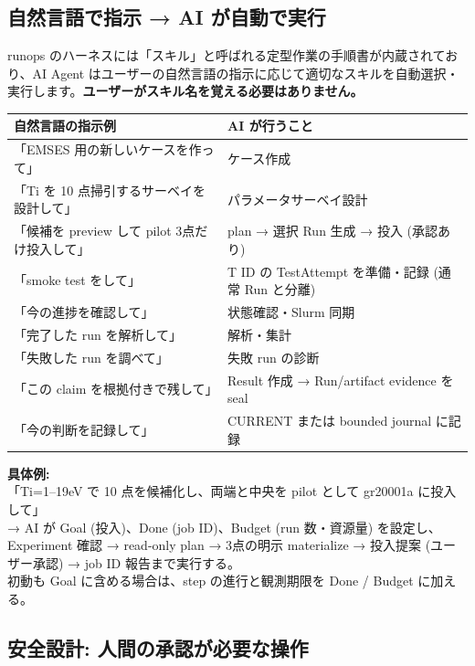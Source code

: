 \documentclass[a4paper,11pt]{article}
\newenvironment{infobox}{%
  \medskip\noindent
  \fboxrule=0.5pt\fboxsep=8pt
  \fcolorbox{infoframe}{infobg}\bgroup\minipage{\dimexpr\linewidth-2\fboxsep-2\fboxrule}
}{%
  \endminipage\egroup\medskip
}
\begin{document}
\subsection*{\color{accent} 自然言語で指示 → AI が自動で実行}

runops のハーネスには「スキル」と呼ばれる定型作業の手順書が内蔵されており、AI Agent はユーザーの自然言語の指示に応じて適切なスキルを自動選択・実行します。\textbf{ユーザーがスキル名を覚える必要はありません。}

\begin{center}
\begin{tabular}{ll}
\toprule
\textbf{自然言語の指示例} & \textbf{AI が行うこと} \\
\midrule
「EMSES 用の新しいケースを作って」 & ケース作成 \\
「Ti を 10 点掃引するサーベイを設計して」 & パラメータサーベイ設計 \\
「候補を preview して pilot 3点だけ投入して」 & plan → 選択 Run 生成 → 投入 (承認あり) \\
「smoke test をして」 & T ID の TestAttempt を準備・記録 (通常 Run と分離) \\
「今の進捗を確認して」 & 状態確認・Slurm 同期 \\
「完了した run を解析して」 & 解析・集計 \\
「失敗した run を調べて」 & 失敗 run の診断 \\
「この claim を根拠付きで残して」 & Result 作成 → Run/artifact evidence を seal \\
「今の判断を記録して」 & CURRENT または bounded journal に記録 \\
\bottomrule
\end{tabular}
\end{center}

\begin{infobox}
\textbf{具体例:}\\
「Ti=1--19eV で 10 点を候補化し、両端と中央を pilot として gr20001a に投入して」\\
→ AI が Goal (投入)、Done (job ID)、Budget (run 数・資源量) を設定し、\\
Experiment 確認 → read-only plan → 3点の明示 materialize → 投入提案
(ユーザー承認) → job ID 報告まで実行する。\\
初動も Goal に含める場合は、step の進行と観測期限を Done / Budget に加える。
\end{infobox}

\subsection*{\color{accent} 安全設計: 人間の承認が必要な操作}
\end{document}
